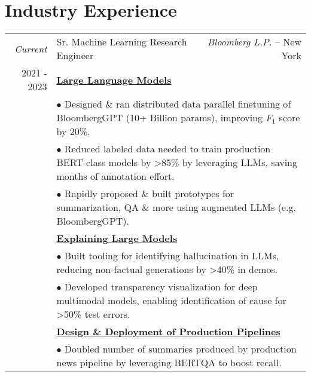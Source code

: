 \documentclass[a4paper,10pt]{article}
\begin{document}
\section{Industry Experience}
\begin{tabularx}{\textwidth}{r|Xr}

\emph{Current} &  Sr. Machine Learning Research Engineer & \emph{Bloomberg L.P.} -- New York\\

\rule{0pt}{1ex} \textsc{2021 - 2023} 

&\multicolumn{2}{l}{
		\footnotesize{\underline{\textbf{Large Language Models}}}
}\\



&\multicolumn{2}{l}{
		\footnotesize{$\bullet$ Designed \& ran distributed data parallel finetuning of BloombergGPT (10+ Billion params), improving $F_1$ score by 20\%.}
}\\

&\multicolumn{2}{l}{
		\footnotesize{$\bullet$ Reduced labeled data needed to train production BERT-class models by >85\% by leveraging LLMs, saving months of annotation effort.}
}\\

&\multicolumn{2}{l}{
		\footnotesize{$\bullet$ Rapidly proposed \& built prototypes for summarization, QA \& more using augmented LLMs (e.g. BloombergGPT).}
}\\


&\multicolumn{2}{l}{
		\footnotesize{\underline{\textbf{Explaining Large Models}}}
}\\

&\multicolumn{2}{l}{
		\footnotesize{$\bullet$ Built tooling for identifying hallucination in LLMs, reducing non-factual generations by >40\% in demos.}
}\\

&\multicolumn{2}{l}{
		\footnotesize{$\bullet$ Developed transparency visualization for deep multimodal models, enabling identification of cause for >50\% test errors.}
}\\

&\multicolumn{2}{l}{
		\footnotesize{\underline{\textbf{Design \& Deployment of Production Pipelines}}}
}\\

&\multicolumn{2}{l}{
		\footnotesize{$\bullet$ Doubled number of summaries produced by production news pipeline by leveraging BERTQA to boost recall.}
}\\


\end{tabularx}
\end{document}
